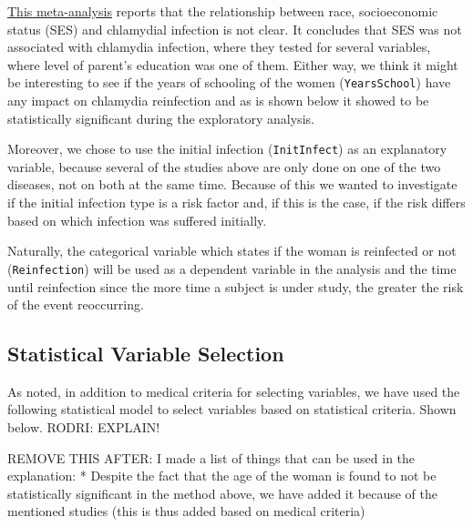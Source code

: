 \documentclass[
]{article}
\begin{document}
\href{https://www.ncbi.nlm.nih.gov/pmc/articles/PMC2094865/}{This meta-analysis} reports that the relationship between race, socioeconomic status (SES) and chlamydial infection is not clear. It concludes that SES was not associated with chlamydia infection, where they tested for several variables, where level of parent's education was one of them. Either way, we think it might be interesting to see if the years of schooling of the women (\texttt{YearsSchool}) have any impact on chlamydia reinfection and as is shown below it showed to be statistically significant during the exploratory analysis.

Moreover, we chose to use the initial infection (\texttt{InitInfect}) as an explanatory variable, because several of the studies above are only done on one of the two diseases, not on both at the same time. Because of this we wanted to investigate if the initial infection type is a risk factor and, if this is the case, if the risk differs based on which infection was suffered initially.

Naturally, the categorical variable which states if the woman is reinfected or not (\texttt{Reinfection}) will be used as a dependent variable in the analysis and the time until reinfection since the more time a subject is under study, the greater the risk of the event reoccurring.

\hypertarget{statistical-variable-selection}{%
\subsection{Statistical Variable Selection}\label{statistical-variable-selection}}

As noted, in addition to medical criteria for selecting variables, we have used the following statistical model to select variables based on statistical criteria. Shown below. RODRI: EXPLAIN!

REMOVE THIS AFTER: I made a list of things that can be used in the explanation:
* Despite the fact that the age of the woman is found to not be statistically significant in the method above, we have added it because of the mentioned studies (this is thus added based on medical criteria)
\end{document}
